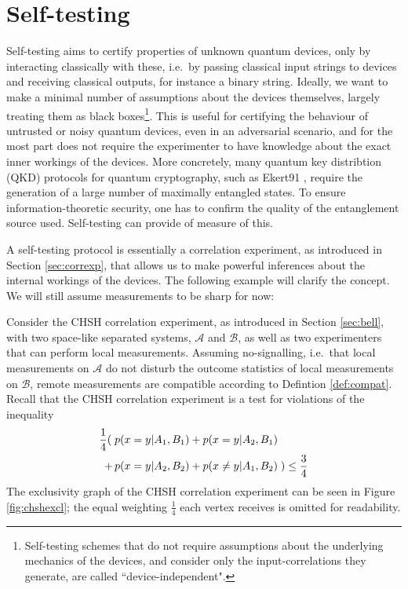 \chapter{Self-testing}
\label{sec:self-testing}

Self-testing aims to certify properties of unknown quantum devices, only by interacting classically with these, i.e.\ by passing classical input strings to devices and receiving classical outputs, for instance a binary string. Ideally, we want to make a minimal number of assumptions about the devices themselves, largely treating them as black boxes\footnote{Self-testing schemes that do not require assumptions about the underlying mechanics of the devices, and consider only the input-correlations they generate, are called ``device-independent".}. This is useful for certifying the behaviour of untrusted or noisy quantum devices, even in an adversarial scenario, and for the most part does not require the experimenter to have knowledge about the exact inner workings of the devices. 
More concretely, many quantum key distribtion (QKD) protocols for quantum cryptography, such as Ekert91 \cite{Ekert91}, require the generation of a large number of maximally entangled states. To ensure information-theoretic security, one has to confirm the quality of the entanglement source used. Self-testing can provide of measure of this.

A self-testing protocol is essentially a correlation experiment, as introduced in Section \ref{sec:correxp}, that allows us to make powerful inferences about the internal workings of the devices. The following example will clarify the concept. We will still assume measurements to be sharp for now:

Consider the CHSH correlation experiment, as introduced in Section \ref{sec:bell}, with two space-like separated systems, $\mathcal{A}$ and $\mathcal{B}$, as well as two experimenters that can perform local measurements. Assuming no-signalling, i.e.\ that local measurements on $\mathcal{A}$ do not disturb the outcome statistics of local measurements on $\mathcal{B}$, remote measurements are compatible according to Defintion \ref{def:compat}. Recall that the CHSH correlation experiment is a test for violations of the inequality
\begin{align*}
    \frac{1}{4}(\; & p(x=y\vert A_1,B_1)+p(x=y\vert A_2,B_1)\\ +\thinspace&p(x=y\vert A_2,B_2)+p(x\neq y \vert A_1,B_2) \;)\leq \frac{3}{4}
\end{align*}
The exclusivity graph of the CHSH correlation experiment can be seen in Figure \ref{fig:chshexcl}; the equal weighting $\frac{1}{4}$ each vertex receives is omitted for readability. 

